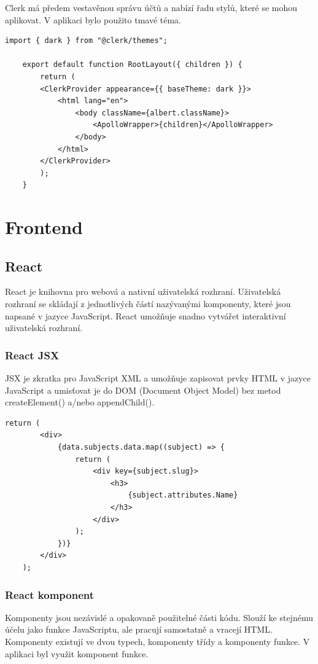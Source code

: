 \documentclass[12pt, a4paper,
oneside,      %
openright
]{report}
\let\oldchapter\chapter
\renewcommand{\chapter}{
	\clearpage %
	\pagestyle{plain} %
	\oldchapter	
}
\begin{document}
Clerk má předem vestavěnou správu účtů a nabízí řadu stylů, které se mohou aplikovat. V aplikaci bylo použito tmavé téma.

\vspace{10pt}

\begin{lstlisting}[style=JavaScript, title={Kód}, caption={Ukázka Clerk dark theme v layout.js}] 
	import { dark } from "@clerk/themes";
	
	export default function RootLayout({ children }) {
		return (
		<ClerkProvider appearance={{ baseTheme: dark }}>
			<html lang="en">
				<body className={albert.className}>
					<ApolloWrapper>{children}</ApolloWrapper>
				</body>
			</html>
		</ClerkProvider>
		);
	}
\end{lstlisting}

\chapter{Frontend}
\label{sec:frontend}

\section{React}
React je knihovna pro webová a nativní uživatelská rozhraní. Uživatelská rozhraní se skládají z jednotlivých částí nazývanými komponenty, které jsou napsané v jazyce JavaScript. React umožňuje snadno vytvářet interaktivní uživatelská rozhraní.

\subsection{React JSX}
JSX je zkratka pro JavaScript XML a umožňuje zapisovat prvky HTML v jazyce JavaScript a umisťovat je do DOM (Document Object Model) bez metod createElement() a/nebo appendChild().

\vspace{10pt}

\begin{lstlisting}[style=JavaScript, title={Kód}, caption={Ukázka využití JSX v page.js}] 
	return (
		<div>
			{data.subjects.data.map((subject) => {
				return (
					<div key={subject.slug}>
						<h3>
							{subject.attributes.Name}
						</h3>
					</div>
				);
			})}
		</div>
	);
\end{lstlisting}

\newpage
\subsection{React komponent}
Komponenty jsou nezávislé a opakovaně použitelné části kódu. Slouží ke stejnému účelu jako funkce JavaScriptu, ale pracují samostatně a vracejí HTML. Komponenty existují ve dvou typech, komponenty třídy a komponenty funkce. V aplikaci byl využit komponent funkce.
\end{document}

